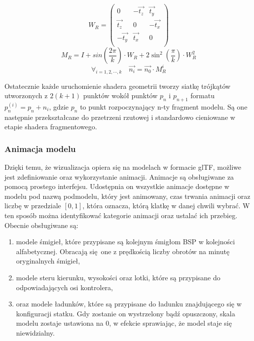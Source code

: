 \begin{equation*}
	W_R = 
	\begin{pmatrix}
		0 & -\vec{t_z} & \vec{t_y} \\
		\vec{t_z} & 0 & -\vec{t_x} \\
		-\vec{t_y} & \vec{t_x} & 0 \\
	\end{pmatrix}
\end{equation*}
\begin{equation*}
	M_R = I + sin \left(\frac{2\pi}{k} \right) \cdot W_R + 2\sin^2 \left(\frac{\pi}{k} \right) \cdot W_R^2
\end{equation*}
\begin{equation*}
	\forall_{i=1,2,\cdots, k} \hspace{1em} \vec{n_i} = \vec{n_0} \cdot M_R^i
\end{equation*}

Ostatecznie każde uruchomienie shadera geometrii tworzy siatkę trójkątów utworzonych z $2(k+1)$ punktów wokół punktów $p_n$ i $p_{n+1}$ formatu $p_n^{(i)} = p_n + n_i$, gdzie $p_n$ to punkt rozpoczynający n-ty fragment modelu. Są one następnie przekształcane do przetrzeni rzutowej i standardowo cieniowane w etapie shadera fragmentowego.

\subsubsection{Animacja modelu}

Dzięki temu, że wizualizacja opiera się na modelach w formacie glTF, możliwe jest zdefiniowanie oraz wykorzystanie animacji. Animacje są obsługiwane za pomocą prostego interfejsu. Udostępnia on wszystkie animacje dostępne w modelu pod nazwą podmodelu, który jest animowany, czas trwania animacji oraz liczbę w przedziale $[0,1]$, która oznacza, którą klatkę w danej chwili wybrać. W ten sposób można identyfikować kategorie animacji oraz ustalać ich przebieg. Obecnie obsługiwane są:
\begin{enumerate}
	\item modele śmigieł, które przypisane są kolejnym śmigłom BSP w kolejności alfabetycznej. Obracają się one z prędkością liczby obrotów na minutę oryginalnych śmigieł,
	\item modele steru kierunku, wysokości oraz lotki, które są przypisane do odpowiadających osi kontrolera,
	\item oraz modele ładunków, które są przypisane do ładunku znajdującego się w konfiguracji statku. Gdy zostanie on wystrzelony bądź opuszczony, skala modelu zostaje ustawiona na $0$, w efekcie sprawiając, że model staje się niewidzialny.
\end{enumerate}

